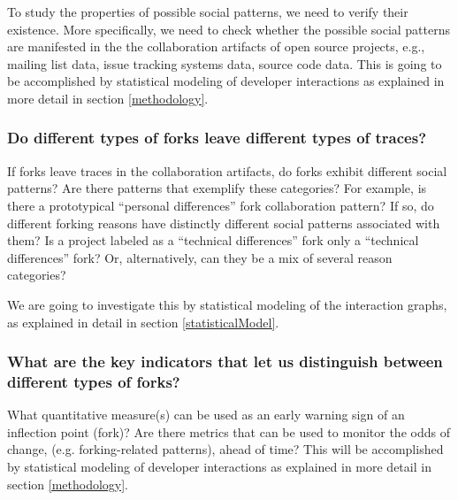 \documentclass[11pt]{report}
\begin{document}
To study the properties of possible social patterns, we need to verify their existence. More specifically, we need to check whether the possible social patterns are manifested in the the collaboration artifacts of open source projects, e.g., mailing list data, issue tracking systems data, source code data. This is going to be accomplished by statistical modeling of developer interactions as explained in more detail in section \ref{methodology}.

\subsubsection{\hspace{4 mm} Do different types of forks leave different types of traces?\\}

If forks leave traces in the collaboration artifacts, do forks exhibit different social patterns? Are there patterns that exemplify these categories? For example, is there a prototypical ``personal differences'' fork collaboration pattern? If so, do different forking reasons have distinctly different social patterns associated with them? Is a project labeled as a ``technical differences'' fork only a ``technical differences'' fork? Or, alternatively, can they be a mix of several reason categories?

We are going to investigate this by statistical modeling of the interaction graphs, as explained in detail in section \ref{statisticalModel}.

\subsubsection{\hspace{4 mm} What are the key indicators that let us distinguish between different types of forks?\\}

What quantitative measure(s) can be used as an early warning sign of an inflection point (fork)? Are there metrics that can be used to monitor the odds of change, (e.g. forking-related patterns), ahead of time? This will be accomplished by statistical modeling of developer interactions as explained in more detail in section \ref{methodology}.

%
%
\end{document}
